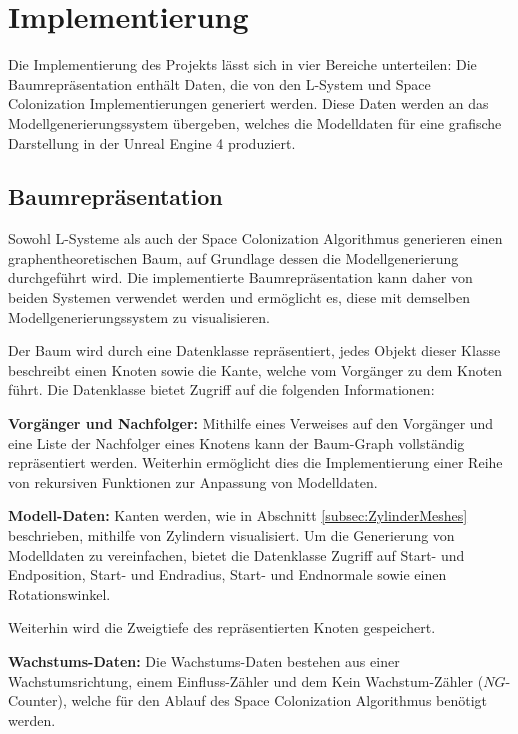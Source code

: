 \chapter{Implementierung}


Die Implementierung des Projekts lässt sich in vier Bereiche unterteilen: Die Baumrepräsentation enthält Daten, die von den L-System und Space Colonization Implementierungen generiert werden. Diese Daten werden an das Modellgenerierungssystem übergeben, welches die Modelldaten für eine grafische Darstellung in der Unreal Engine 4 produziert.


\section{Baumrepräsentation}

Sowohl L-Systeme als auch der Space Colonization Algorithmus generieren einen graphentheoretischen Baum, auf Grundlage dessen die Modellgenerierung durchgeführt wird. Die implementierte Baumrepräsentation kann daher von beiden Systemen verwendet werden und ermöglicht es, diese mit demselben Modellgenerierungssystem zu visualisieren.

Der Baum wird durch eine Datenklasse repräsentiert, jedes Objekt dieser Klasse beschreibt einen Knoten sowie die Kante, welche vom Vorgänger zu dem Knoten führt. Die Datenklasse bietet Zugriff auf die folgenden Informationen:

\begin{description}
	\item \textbf{Vorgänger und Nachfolger:} Mithilfe eines Verweises auf den Vorgänger und eine Liste der Nachfolger eines Knotens kann der Baum-Graph vollständig repräsentiert werden. Weiterhin ermöglicht dies die Implementierung einer Reihe von rekursiven Funktionen zur Anpassung von Modelldaten.\\
	
	\item \textbf{Modell-Daten:} Kanten werden, wie in Abschnitt \ref{subsec:ZylinderMeshes} beschrieben, mithilfe von Zylindern visualisiert. Um die Generierung von Modelldaten zu vereinfachen, bietet die Datenklasse Zugriff auf Start- und Endposition, Start- und Endradius, Start- und Endnormale sowie einen Rotationswinkel. 
	
	Weiterhin wird die Zweigtiefe des repräsentierten Knoten gespeichert.\\
	
	\item \textbf{Wachstums-Daten:} Die Wachstums-Daten bestehen aus einer Wachstumsrichtung, einem Einfluss-Zähler und dem \glqq Kein Wachstum\grqq-Zähler ($NG$-Counter), welche für den Ablauf des Space Colonization Algorithmus benötigt werden.	
\end{description}

